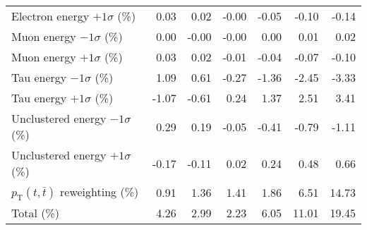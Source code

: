 \begin{table}[htbp]
{\begin{tabular}{lrrrrrr}
Electron energy $+1\sigma$ (\%) & 0.03 & 0.02 & -0.00 & -0.05 & -0.10 & -0.14 \\ 
Muon energy $-1\sigma$ (\%) & 0.00 & -0.00 & -0.00 & 0.00 & 0.01 & 0.02 \\ 
Muon energy $+1\sigma$ (\%) & 0.03 & 0.02 & -0.01 & -0.04 & -0.07 & -0.10 \\ 
Tau energy $-1\sigma$ (\%) & 1.09 & 0.61 & -0.27 & -1.36 & -2.45 & -3.33 \\ 
Tau energy $+1\sigma$ (\%) & -1.07 & -0.61 & 0.24 & 1.37 & 2.51 & 3.41 \\ 
Unclustered energy $-1\sigma$ (\%) & 0.29 & 0.19 & -0.05 & -0.41 & -0.79 & -1.11 \\ 
Unclustered energy $+1\sigma$ (\%) & -0.17 & -0.11 & 0.02 & 0.24 & 0.48 & 0.66 \\ 
$p_\mathrm{T}(t,\bar{t})$ reweighting (\%) & 0.91 & 1.36 & 1.41 & 1.86 & 6.51 & 14.73 \\ 
\hline 
Total (\%) & 4.26  & 2.99  & 2.23  & 6.05  & 11.01  & 19.45 \\ 
\hline 
\end{tabular}
}
\end{table}
